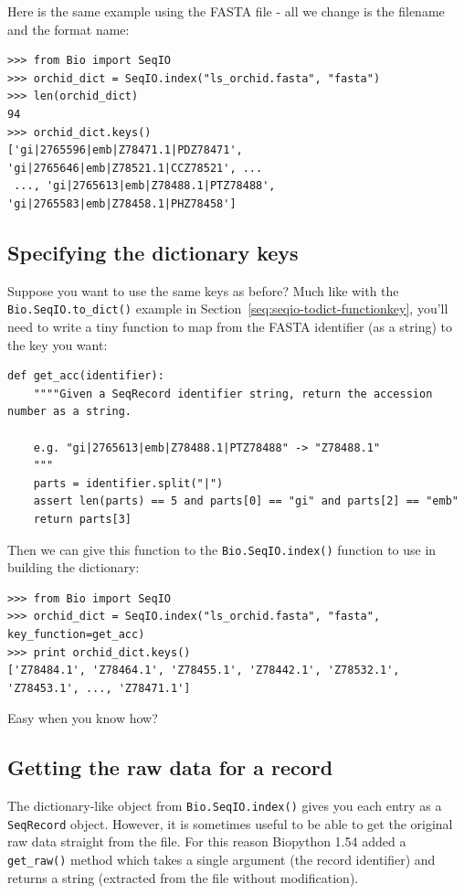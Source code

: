 \documentclass{report}
\begin{document}
Here is the same example using the FASTA file - all we change is the
filename and the format name:

\begin{verbatim}
>>> from Bio import SeqIO
>>> orchid_dict = SeqIO.index("ls_orchid.fasta", "fasta")
>>> len(orchid_dict)
94
>>> orchid_dict.keys()
['gi|2765596|emb|Z78471.1|PDZ78471', 'gi|2765646|emb|Z78521.1|CCZ78521', ...
 ..., 'gi|2765613|emb|Z78488.1|PTZ78488', 'gi|2765583|emb|Z78458.1|PHZ78458']
\end{verbatim}

\subsection{Specifying the dictionary keys}
\label{seq:seqio-index-functionkey}

Suppose you want to use the same keys as before? Much like with the
\verb|Bio.SeqIO.to_dict()| example in Section~\ref{seq:seqio-todict-functionkey},
you'll need to write a tiny function to map from the FASTA identifier
(as a string) to the key you want:

\begin{verbatim}
def get_acc(identifier):
    """"Given a SeqRecord identifier string, return the accession number as a string.
  
    e.g. "gi|2765613|emb|Z78488.1|PTZ78488" -> "Z78488.1"
    """
    parts = identifier.split("|")
    assert len(parts) == 5 and parts[0] == "gi" and parts[2] == "emb"
    return parts[3]
\end{verbatim}

\noindent Then we can give this function to the \verb|Bio.SeqIO.index()|
function to use in building the dictionary:

\begin{verbatim}
>>> from Bio import SeqIO
>>> orchid_dict = SeqIO.index("ls_orchid.fasta", "fasta", key_function=get_acc)
>>> print orchid_dict.keys()
['Z78484.1', 'Z78464.1', 'Z78455.1', 'Z78442.1', 'Z78532.1', 'Z78453.1', ..., 'Z78471.1']
\end{verbatim}

\noindent Easy when you know how?

\subsection{Getting the raw data for a record}
\label{sec:seqio-index-getraw}

The dictionary-like object from \verb|Bio.SeqIO.index()| gives you each
entry as a \verb|SeqRecord| object. However, it is sometimes useful to
be able to get the original raw data straight from the file. For this
reason Biopython 1.54 added a \verb|get_raw()| method which takes a
single argument (the record identifier) and returns a string (extracted
from the file without modification).
\end{document}
